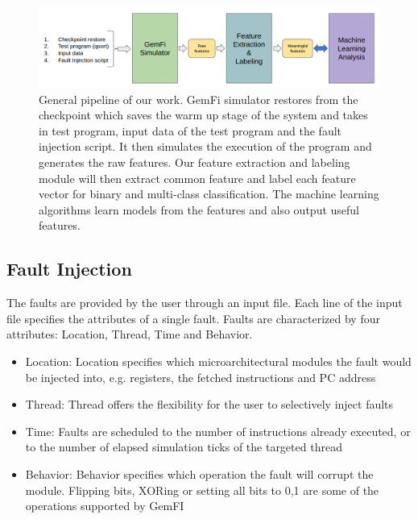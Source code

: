 \begin{figure}[t]
\begin{center}
   \includegraphics[width=0.95\linewidth]{./figures/pipeline.png}
\end{center}
   \caption{\footnotesize General pipeline of our work. GemFi simulator restores from the checkpoint which saves the warm up stage of the system and takes in test program, input data of the test program and the fault injection script. It then simulates the execution of the program and generates the raw features. Our feature extraction and labeling module will then extract common feature and label each feature vector for binary and multi-class classification. The machine learning algorithms learn models from the features and also output useful features.}
\vspace{-0.3cm}
\label{fig:pipeline}
\end{figure}



\subsection{Fault Injection}\label{section:FI}
The faults are provided by the user through an input file. Each line of the input file specifies the attributes of a single fault. Faults are characterized by four attributes: Location, Thread, Time and Behavior. 
\begin{itemize}
\item Location: Location specifies which microarchitectural modules the fault would be injected into, e.g. registers, the fetched instructions and PC address
\item Thread: Thread offers the flexibility for the user to selectively inject faults
\item Time: Faults are scheduled to the number of instructions already executed, or to the number of elapsed simulation ticks of the targeted thread
\item Behavior: Behavior specifies which operation the fault will corrupt the module. Flipping bits, XORing or setting all bits to 0,1 are some of the operations supported by GemFI
\end{itemize}

